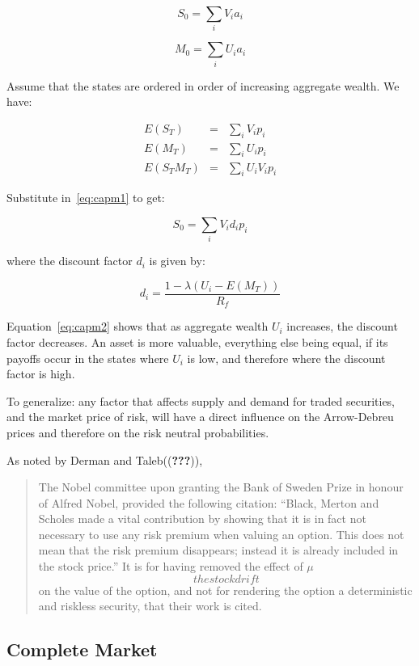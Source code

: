 \documentclass[justified]{tufte-book}
\begin{document}
\[S_0 = \sum_i V_i a_i\]

\[M_0 = \sum_i U_i a_i\]

Assume that the states are ordered in order of increasing aggregate
wealth. We have:

\[\begin{aligned}
    E(S_T) & = & \sum_i V_i p_i \\
    E(M_T) & = & \sum_i U_i p_i \\
    E(S_T M_T) & = & \sum_i U_i V_i p_i\end{aligned}\]

Substitute in~\eqref{eq:capm1} to get:

\[S_0 = \sum_i V_i d_i p_i\]

where the discount factor \(d_i\) is given by:

\[d_i = \frac{1-\lambda(U_i - E(M_T))}{R_f}
    \label{eq:capm2}\]

Equation~\eqref{eq:capm2} shows that as aggregate wealth \(U_i\) increases,
the discount factor decreases. An asset is more valuable, everything
else being equal, if its payoffs occur in the states where \(U_i\) is low,
and therefore where the discount factor is high.

To generalize: any factor that affects supply and demand for traded
securities, and the market price of risk, will have a direct influence
on the Arrow-Debreu prices and therefore on the risk neutral
probabilities.

As noted by Derman and Taleb(({\textbf{???}})),

\begin{quote}
The Nobel committee upon granting the Bank of Sweden Prize in honour
of Alfred Nobel, provided the following citation: ``Black, Merton and
Scholes made a vital contribution by showing that it is in fact not
necessary to use any risk premium when valuing an option. This does
not mean that the risk premium disappears; instead it is already
included in the stock price.'' It is for having removed the effect of
\(\mu\) \[the stock drift\] on the value of the option, and not for
rendering the option a deterministic and riskless security, that their
work is cited.
\end{quote}

\hypertarget{complete-market}{%
\subsection{Complete Market}\label{complete-market}}
\end{document}
